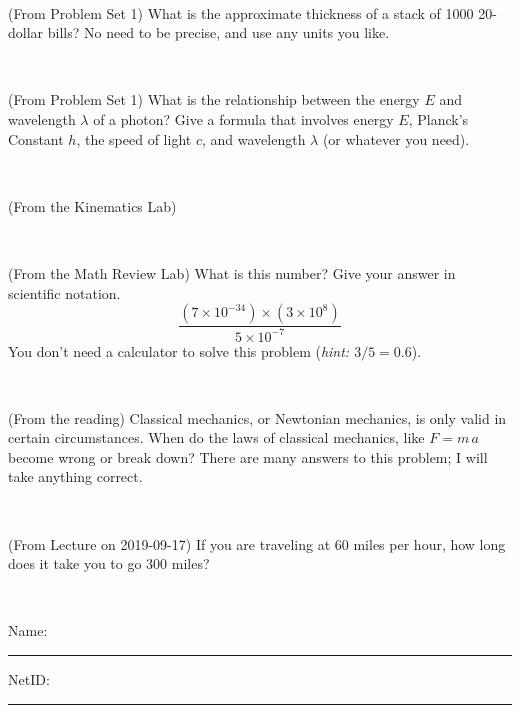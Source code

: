 \documentclass[12pt, letterpaper]{article}
\begin{document}
\vfill ~

\begin{problem} (From Problem Set 1)
What is the approximate thickness of a stack of 1000 20-dollar bills?
No need to be precise, and use any units you like.
\end{problem}


\vfill ~

\begin{problem} (From Problem Set 1)
What is the relationship between the energy $E$ and wavelength
$\lambda$ of a photon? Give a formula that involves energy $E$,
Planck's Constant $h$, the speed of light $c$, and wavelength
$\lambda$ (or whatever you need).
\end{problem}

\vfill ~


\clearpage


\begin{problem} (From the Kinematics Lab)

\end{problem}


\vfill ~

\begin{problem} (From the Math Review Lab)
What is this number? Give your answer in scientific notation.
$$
\frac{(7\times10^{-34})\times(3\times10^8)}{5\times10^{-7}}
$$
You don't need a calculator to solve this problem (\textit{hint: $3/5=0.6$}).
\end{problem}


\vfill ~

\begin{problem} (From the reading)
Classical mechanics, or Newtonian mechanics, is only valid in certain
circumstances. When do the laws of classical mechanics, like $F =
m\,a$ become wrong or break down? There are many answers to this
problem; I will take anything correct.
\end{problem}


\vfill ~

\begin{problem} (From Lecture on 2019-09-17)
If you are traveling at 60 miles per hour, how long does
it take you to go 300 miles?
\end{problem}


\vfill ~


\cleardoublepage



\noindent
Name: \rule[-1ex]{0.60\textwidth}{0.1pt}
NetID: \rule[-1ex]{0.20\textwidth}{0.1pt}
\end{document}
